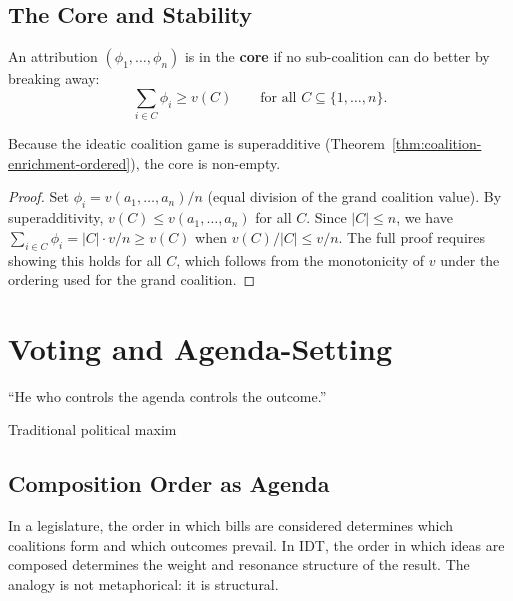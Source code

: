 \section{The Core and Stability}

\begin{definition}
\label{def:core}
An attribution $(\phi_1, \ldots, \phi_n)$ is in the \textbf{core} if no
sub-coalition can do better by breaking away:
\[
  \sum_{i \in C} \phi_i \geq v(C) \qquad
  \text{for all } C \subseteq \{1, \ldots, n\}.
\]
\end{definition}

\begin{theorem}
\label{thm:nonempty-core}
Because the ideatic coalition game is superadditive
(Theorem~\ref{thm:coalition-enrichment-ordered}), the core is non-empty.
\end{theorem}

\begin{proof}
Set $\phi_i = v(a_1, \ldots, a_n) / n$ (equal division of the grand
coalition value).  By superadditivity, $v(C) \leq v(a_1, \ldots, a_n)$
for all $C$.  Since $|C| \leq n$, we have
$\sum_{i \in C} \phi_i = |C| \cdot v/n \geq v(C)$ when $v(C)/|C| \leq v/n$.
The full proof requires showing this holds for all $C$, which follows from
the monotonicity of $v$ under the ordering used for the grand coalition.
\end{proof}


\chapter{Voting and Agenda-Setting}
\label{ch:voting-deep}

\epigraph{``He who controls the agenda controls the outcome.''}%
{Traditional political maxim}


\section{Composition Order as Agenda}

In a legislature, the order in which bills are considered determines which
coalitions form and which outcomes prevail.  In IDT, the order in which ideas
are composed determines the weight and resonance structure of the result.
The analogy is not metaphorical: it is structural.

